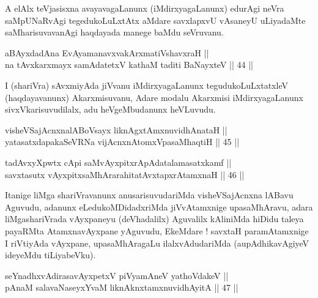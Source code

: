 \begin{artha}
A elAlx teVjasisxna avayavagaLanunx (iMdirxyagaLanunx) edurAgi neVra
saMpUNaRvAgi tegedukoLuLxtAtx aMdare savxlapxvU vAsaneyU uLiyadaMte
saMharisuvavanAgi haqdayada manege baMdu seVruvanu.
\end{artha}


\begin{shl}
aBAyxdadAna EvAyamanavxvakArxmatiVshavxraH || \\
na tAvxkarxmayx samAdatetxV kathaM taditi BaNayxteV \hfill || 44 ||  
\end{shl}

\begin{artha}
I (shariVra) sAvxmiyAda jiVvanu iMdirxyagaLanunx tegudukoLuLxtatxleV
(haqdayavanunx) Akarxmisuvanu, Adare modalu Akarxmisi iMdirxyagaLanunx
sivxVkarisuvudilalx, adu heVgeMbudanunx heVLuvudu.
\end{artha}


\begin{shl}
visheVSajAcnxnalABoV\s sayx liknAgxtAmxnuvidhAnataH || \\
yatasatxdapakaSeVRNa vijAcnxnAtomxVpasaMhaqtiH \hfill || 45 ||  
\end{shl}

\begin{shl}
tadAvxyXpwtx cApi saMvAyxpitxrApAdatalamasatxkamf || \\
savxtasutx vAyxpitxsaMhArarahitatAvxtapxrAtamxnaH \hfill || 46 ||  
\end{shl}

\begin{artha}
Itanige liMga shariVravanunx anusarisuvudariMda visheVSajAcnxna lABavu
Aguvudu, adanunx eLedukoMDidadxriMda jiVvAtamxnige upasaMhAravu, adara
liMgashariVrada vAyxpaneyu (deVhadalilx) Aguvalilx kAliniMda hiDidu
taleya payaRMta AtamxnavAyxpane yAguvudu, EkeMdare ! savxtaH
paramAtamxnige I riVtiyAda vAyxpane, upasaMhAragaLu ilalxvAdudariMda
(aupAdhikavAgiyeV ideyeMdu tiLiyabeVku).
\end{artha}


\begin{shl}
seYnadhxvAdirasavAyxpetxV piVyamAneV yathoVdakeV || \\
pAnaM salavaNaseyxYvaM liknAknxtamxnuvidhAyitA \hfill || 47 ||  
\end{shl}

